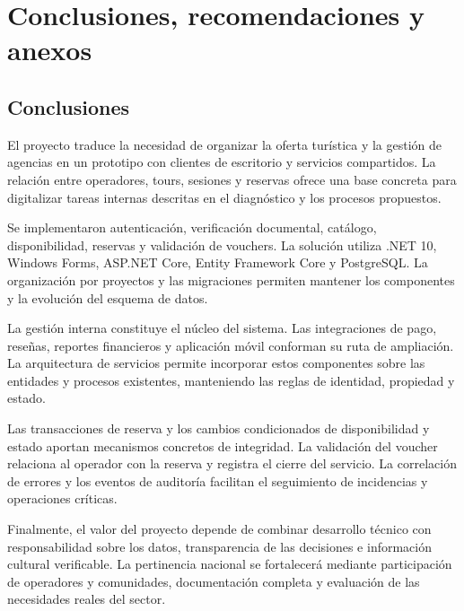 \chapter{Conclusiones, recomendaciones y anexos}
\label{cap:cierre}
\section{Conclusiones}
El proyecto traduce la necesidad de organizar la oferta turística y la gestión de agencias en un prototipo con clientes de escritorio y servicios compartidos. La relación entre operadores, tours, sesiones y reservas ofrece una base concreta para digitalizar tareas internas descritas en el diagnóstico y los procesos propuestos.

Se implementaron autenticación, verificación documental, catálogo, disponibilidad, reservas y validación de vouchers. La solución utiliza .NET 10, Windows Forms, ASP.NET Core, Entity Framework Core y PostgreSQL. La organización por proyectos y las migraciones permiten mantener los componentes y la evolución del esquema de datos.

La gestión interna constituye el núcleo del sistema. Las integraciones de pago, reseñas, reportes financieros y aplicación móvil conforman su ruta de ampliación. La arquitectura de servicios permite incorporar estos componentes sobre las entidades y procesos existentes, manteniendo las reglas de identidad, propiedad y estado.

Las transacciones de reserva y los cambios condicionados de disponibilidad y estado aportan mecanismos concretos de integridad. La validación del voucher relaciona al operador con la reserva y registra el cierre del servicio. La correlación de errores y los eventos de auditoría facilitan el seguimiento de incidencias y operaciones críticas.

Finalmente, el valor del proyecto depende de combinar desarrollo técnico con responsabilidad sobre los datos, transparencia de las decisiones e información cultural verificable. La pertinencia nacional se fortalecerá mediante participación de operadores y comunidades, documentación completa y evaluación de las necesidades reales del sector.

